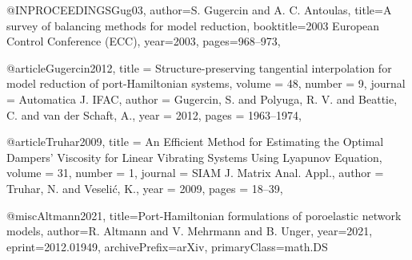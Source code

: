 @INPROCEEDINGS{Gug03,
  author={S. {Gugercin} and A. C. {Antoulas}},
  title={A survey of balancing methods for model reduction}, 
  booktitle={2003 European Control Conference (ECC)}, 
  year={2003},
  pages={968--973},
}

@article{Gugercin2012,
	title = {Structure-preserving tangential interpolation for model reduction of port-{Hamiltonian} systems},
	volume = {48},
	number = {9},
	journal = {Automatica J. IFAC},
	author = {Gugercin, S. and Polyuga, R. V. and Beattie, C. and van der Schaft, A.},
	year = {2012},
	pages = {1963--1974},
}

@article{Truhar2009,
	title = {An Efficient Method for Estimating the Optimal Dampers' Viscosity for Linear Vibrating Systems Using {L}yapunov Equation},
	volume = {31},
	number = {1},
	journal = {SIAM J. Matrix Anal. Appl.},
	author = {Truhar, N. and Veseli\'c, K.},
	year = {2009},
	pages = {18--39},
}

@misc{Altmann2021,
      title={Port-Hamiltonian formulations of poroelastic network models}, 
      author={R. Altmann and V. Mehrmann and B. Unger},
      year={2021},
      eprint={2012.01949},
      archivePrefix={arXiv},
      primaryClass={math.DS}
}

